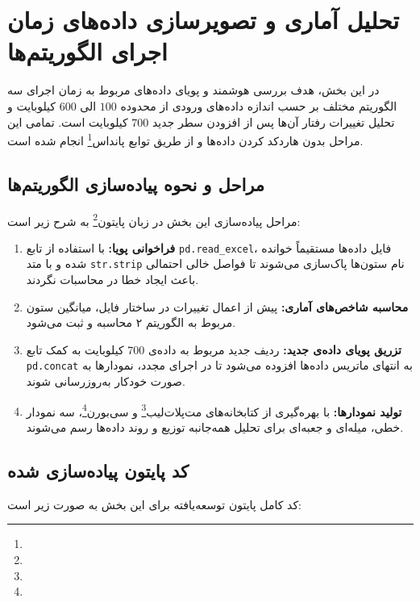 \section{تحلیل آماری و تصویرسازی داده‌های زمان اجرای الگوریتم‌ها}
در این بخش، هدف بررسی هوشمند و پویای داده‌های مربوط به زمان اجرای سه الگوریتم مختلف بر حسب اندازه داده‌های ورودی از محدوده $ 100 $ الی $ 600 $ کیلوبایت و تحلیل تغییرات رفتار آن‌ها پس از افزودن سطر جدید $ 700 $ کیلوبایت است. تمامی این مراحل بدون هاردکد کردن داده‌ها و از طریق توابع پانداس\footnote{} انجام شده است.

\subsection{مراحل و نحوه پیاده‌سازی الگوریتم‌ها}
مراحل پیاده‌سازی این بخش در زبان پایتون\footnote{} به شرح زیر است:
\begin{enumerate}
    \item \textbf{فراخوانی پویا:} با استفاده از تابع \lstinline|pd.read_excel|، فایل داده‌ها مستقیماً خوانده شده و با متد \lstinline|str.strip| نام ستون‌ها پاک‌سازی می‌شوند تا فواصل خالی احتمالی باعث ایجاد خطا در محاسبات نگردند.
    \item \textbf{محاسبه شاخص‌های آماری:} پیش از اعمال تغییرات در ساختار فایل، میانگین ستون مربوط به الگوریتم ۲ محاسبه و ثبت می‌شود.
    \item \textbf{تزریق پویای داده‌ی جدید:} ردیف جدید مربوط به داده‌ی $ 700 $ کیلوبایت به کمک تابع \lstinline|pd.concat| به انتهای ماتریس داده‌ها افزوده می‌شود تا در اجرای مجدد، نمودارها به صورت خودکار به‌روزرسانی شوند.
    \item \textbf{تولید نمودارها:} با بهره‌گیری از کتابخانه‌های مت‌پلات‌لیب\footnote{} و سی‌بورن\footnote{}، سه نمودار خطی، میله‌ای و جعبه‌ای برای تحلیل همه‌جانبه توزیع و روند داده‌ها رسم می‌شوند.
\end{enumerate}

\subsection{کد پایتون پیاده‌سازی شده}
کد کامل پایتون توسعه‌یافته برای این بخش به صورت زیر است:

